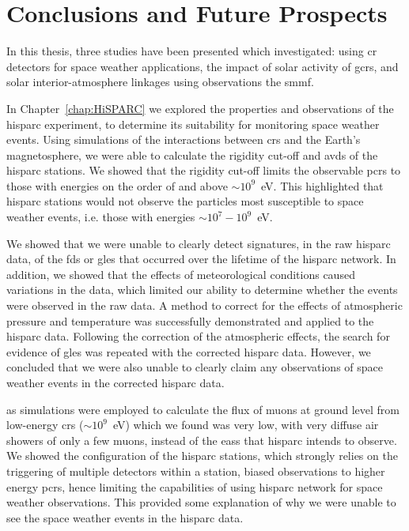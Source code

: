 \chapter{Conclusions and Future Prospects}\label{chap:conc}

In this thesis, three studies have been presented which investigated: using \gls{cr} detectors for space weather applications, the impact of solar activity of \glspl{gcr}, and solar interior-atmosphere linkages using observations the \gls{smmf}. %

In Chapter~\ref{chap:HiSPARC} we explored the properties and observations of the \gls{hisparc} experiment, to determine its suitability for monitoring space weather events. Using simulations of the interactions between \glspl{cr} and the Earth's magnetosphere, we were able to calculate the rigidity cut-off and \glspl{avd} of the \gls{hisparc} stations. We showed that the rigidity cut-off limits the observable \glspl{pcr} to those with energies on the order of and above $\sim 10^9$~eV. This highlighted that \gls{hisparc} stations would not observe the particles most susceptible to space weather events, i.e. those with energies $\sim 10^7-10^9$~eV.

We showed that we were unable to clearly detect signatures, in the raw \gls{hisparc} data, of the \glspl{fd} or \glspl{gle} that occurred over the lifetime of the \gls{hisparc} network. In addition, we showed that the effects of meteorological conditions caused variations in the data, which limited our ability to determine whether the events were observed in the raw data. A method to correct for the effects of atmospheric pressure and temperature was successfully demonstrated and applied to the \gls{hisparc} data. Following the correction of the atmospheric effects, the search for evidence of \glspl{gle} was repeated with the corrected \gls{hisparc} data. However, we concluded that we were also unable to clearly claim any observations of space weather events in the corrected \gls{hisparc} data.

\gls{as} simulations were employed to calculate the flux of muons at ground level from low-energy \glspl{cr} ($\sim 10^9$~eV) which we found was very low, with very diffuse air showers of only a few muons, instead of the \glspl{eas} that \gls{hisparc} intends to observe. We showed the configuration of the \gls{hisparc} stations, which strongly relies on the triggering of multiple detectors within a station, biased observations to higher energy \glspl{pcr}, hence limiting the capabilities of using \gls{hisparc} network for space weather observations. This provided some explanation of why we were unable to see the space weather events in the \gls{hisparc} data.

